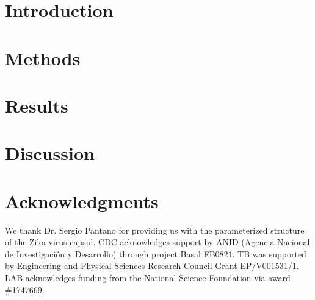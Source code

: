\documentclass[final,5p,times,twocolumn]{elsarticle}
\begin{document}
\section{Introduction}\label{sec:intro}


\section{Methods}\label{sec:methods}




\section{Results}\label{sec:results}


\section{Discussion} \label{sec:discussion}


\section*{Acknowledgments}
We thank Dr. Sergio Pantano for providing us with the parameterized structure of the Zika virus capsid.
CDC acknowledges support by ANID (Agencia Nacional de Investigaci\'{o}n y Desarrollo) through project Basal FB0821.
TB was supported by Engineering and Physical Sciences Research Council Grant EP/V001531/1.
LAB acknowledges funding from the National Science Foundation via award \#1747669.
{}

\end{document}

